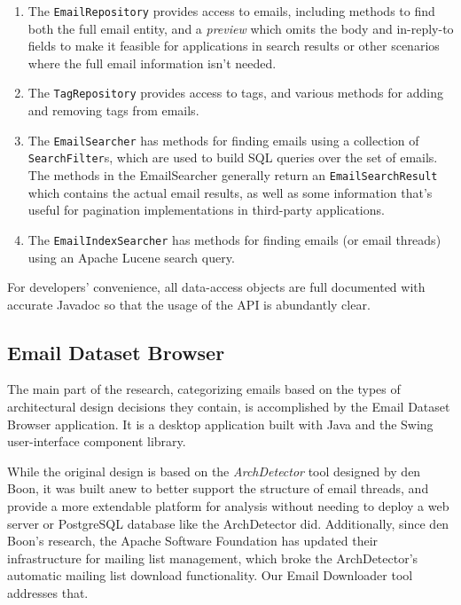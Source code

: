 \documentclass[a4paper, 12pt]{article}
\begin{document}
			\begin{enumerate}
				\item The \texttt{EmailRepository} provides access to emails, including methods to find both the full email entity, and a \textit{preview} which omits the body and in-reply-to fields to make it feasible for applications in search results or other scenarios where the full email information isn't needed.
				\item The \texttt{TagRepository} provides access to tags, and various methods for adding and removing tags from emails.
				\item The \texttt{EmailSearcher} has methods for finding emails using a collection of \texttt{SearchFilter}s, which are used to build SQL queries over the set of emails. The methods in the EmailSearcher generally return an \texttt{EmailSearchResult} which contains the actual email results, as well as some information that's useful for pagination implementations in third-party applications.
				\item The \texttt{EmailIndexSearcher} has methods for finding emails (or email threads) using an Apache Lucene search query.
			\end{enumerate}
		
			For developers' convenience, all data-access objects are full documented with accurate Javadoc so that the usage of the API is abundantly clear.
	
	\newpage
	\subsection{Email Dataset Browser}
		\label{sec:email-dataset-browser}
		The main part of the research, categorizing emails based on the types of architectural design decisions they contain, is accomplished by the Email Dataset Browser application. It is a desktop application built with Java and the Swing user-interface component library.
		
		While the original design is based on the \textit{ArchDetector} tool designed by den Boon\cite{denboon}, it was built anew to better support the structure of email threads, and provide a more extendable platform for analysis without needing to deploy a web server or PostgreSQL database like the ArchDetector did. Additionally, since den Boon's research, the Apache Software Foundation has updated their infrastructure for mailing list management, which broke the ArchDetector's automatic mailing list download functionality. Our Email Downloader tool addresses that.
		
\end{document}
